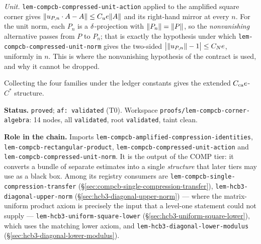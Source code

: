 \emph{Unit.} \texttt{lem-compcb-compressed-unit-action} applied to the amplified square
corner gives $\lVert u_{P,n}\mathbin{\cdot} A-A\rVert\le C_ue\lVert A\rVert$ and its right-hand mirror at
every $n$. For the unit norm, each $P_n$ is a $\delta$-projection with
$\lVert P_n\rVert=\lVert P\rVert$, so the \emph{nonvanishing} alternative passes from $P$ to $P_n$; that
is exactly the hypothesis under which
\texttt{lem-compcb-compressed-unit-norm} gives the two-sided
$\bigl\lvert\lVert u_{P,n}\rVert-1\bigr\rvert\le C_Ne$, uniformly in $n$. This is where
the nonvanishing hypothesis of the contract is used, and why it cannot be dropped.

Collecting the four families under the ledger constants gives the extended
$C_{\mathrm{ca}}e$-$C^*$ structure.

\medskip
\noindent\textbf{Status.} \texttt{proved}; \texttt{af: validated} (T0). Workspace
\texttt{proofs/lem-compcb-corner-algebra}: 14 nodes, all \texttt{validated}, root
\texttt{validated}, taint clean.

\noindent\textbf{Role in the chain.} Imports
\texttt{lem-compcb-amplified-compression-identities},
\texttt{lem-compcb-rectangular-product},
\texttt{lem-compcb-compressed-unit-action} and
\texttt{lem-compcb-compressed-unit-norm}. It is the output of the COMP tier: it converts a
bundle of separate estimates into a single \emph{structure} that later tiers may use as a
black box. Among its registry consumers are
\texttt{lem-compcb-single-compression-transfer}
(\S\ref{sec:compcb-single-compression-transfer}),
\texttt{lem-hcb3-diagonal-upper-norm} (\S\ref{sec:hcb3-diagonal-upper-norm}) --- where the
matrix-uniform product axiom is precisely the input that a level-one statement could not
supply --- \texttt{lem-hcb3-uniform-square-lower}
(\S\ref{sec:hcb3-uniform-square-lower}), which uses the matching lower axiom, and
\texttt{lem-hcb3-diagonal-lower-modulus} (\S\ref{sec:hcb3-diagonal-lower-modulus}).
